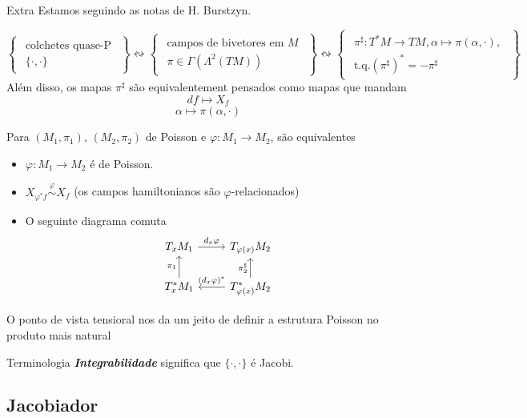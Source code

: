 \begin{thing6}{Extra}\leavevmode
Estamos seguindo as notas de H. Burstzyn.
\end{thing6}
\[\left\{ \substack{\begin{array}{c}\text{colchetes quase-P}  \\ \{\cdot ,\cdot \}\end{array}} \right\} \leftrightsquigarrow \left\{ \substack{\begin{array}{c}\text{campos de bivetores em \(M\)}  \\ \pi \in \Gamma(\Lambda^{2}(TM))\end{array}}\right\} \leftrightsquigarrow \left\{\substack{\begin{array}{c}\pi^\sharp:T^*M \to TM, \alpha \mapsto  \pi(\alpha,\cdot), \\ \text{t.q.}  (\pi ^\sharp)^*=-\pi ^\sharp \end{array}}\right\}\]
Além disso, os mapas \(\pi ^\sharp\) são equivalentement pensados como mapas que mandam
\[df \mapsto  X_f\]
\[\alpha \mapsto  \pi(\alpha,\cdot)\]
\begin{exercise}\leavevmode
Para \((M_1,\pi_1)\), \((M_2,\pi_2)\) de Poisson e \(\varphi:M_1 \to M_2\), são equivalentes
\begin{itemize}
\item \(\varphi:M_1\to M_2\) é de Poisson.
\item \(X_{\varphi^*f}\overset{\varphi}{\sim}X_f\) (os campos hamiltonianos são \(\varphi\)-relacionados)
\item O seguinte diagrama comuta
	\[\begin{tikzcd}
		T_xM_1 \arrow[r, "d_x\varphi"]&  T_{\varphi(x)}M_2\\
		T_x^*M_1\arrow[u,"\pi_1"]& T_{\varphi(x)}^* M_2\arrow[l,swap,"(d_x\varphi)^*"]\arrow[u,"\pi_2^\sharp"]
	\end{tikzcd}\]
\end{itemize}
\end{exercise}

O ponto de vista tensioral nos da um jeito de definir a estrutura Poisson no produto mais natural
\begin{thing7}{Terminologia}\leavevmode
\textit{\textbf{Integrabilidade}} significa que \(\{\cdot,\cdot\}\) é Jacobi.
\end{thing7}

\subsection{Jacobiador}

